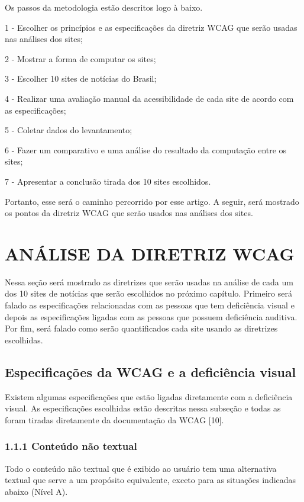 \documentclass[a4paper]{article}
\begin{document}
\begin{titlepage}
Os passos da metodologia estão descritos logo à baixo.

1 - Escolher os princípios e as especificações da diretriz WCAG que serão usadas nas análises dos sites;

2 - Mostrar a forma de computar os sites;

3 - Escolher 10 sites de notícias do Brasil;

4 - Realizar uma avaliação manual da acessibilidade de cada site de acordo com as especificações;

5 - Coletar dados do levantamento;

6 - Fazer um comparativo e uma análise do resultado da computação entre os sites;

7 - Apresentar a conclusão tirada dos 10 sites escolhidos.

Portanto, esse será o caminho percorrido por esse artigo. A seguir, será mostrado os pontos da diretriz WCAG que serão usados nas análises dos sites.  

\section{ANÁLISE DA DIRETRIZ WCAG}

Nessa seção será mostrado as diretrizes que serão usadas na análise de cada um dos 10 sites de notícias que serão escolhidos no próximo capítulo. Primeiro será falado as especificações relacionadas com as pessoas que tem deficiência visual e depois as especificações ligadas com as pessoas que possuem deficiência auditiva. Por fim, será falado como serão quantificados cada site usando as diretrizes escolhidas.

\subsection{Especificações da WCAG e a deficiência visual}

Existem algumas especificações que estão ligadas diretamente com a deficiência visual. As especificações escolhidas estão descritas nessa subseção e todas as foram tiradas diretamente da documentação da WCAG [10].

\subsubsection{1.1.1 Conteúdo não textual}

Todo o conteúdo não textual que é exibido ao usuário tem uma alternativa textual que serve a um propósito equivalente, exceto para as situações indicadas abaixo (Nível A).\\


\end{titlepage}
\end{document}
